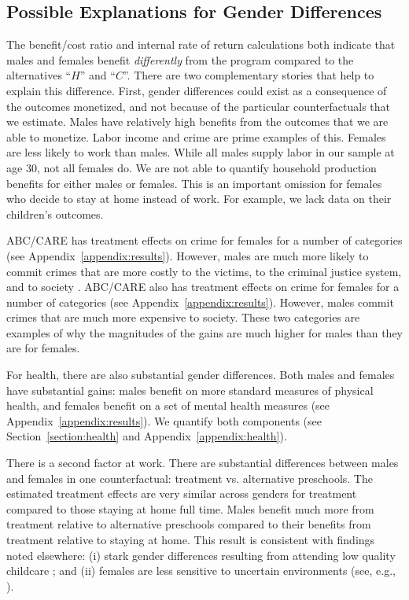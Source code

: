 \subsection{Possible Explanations for Gender Differences}

The benefit/cost ratio and internal rate of return calculations both indicate that males and females benefit \emph{differently} from the program compared to the alternatives ``$H$'' and ``$C$''. There are two complementary stories that help to explain this difference. First, gender differences could exist as a consequence of the outcomes monetized, and not because of the particular counterfactuals that we estimate. Males have relatively high benefits from the outcomes that we are able to monetize. Labor income and crime are prime examples of this. Females are less likely to work than males. While all males supply labor in our sample at age 30, not all females do. We are not able to quantify household production benefits for either males or females. This is an important omission for females who decide to stay at home instead of work. For example, we lack data on their children's outcomes.

ABC/CARE has treatment effects on crime for females for a number of categories (see Appendix~\ref{appendix:results}). However, males are much more likely to commit crimes that are more costly to the victims, to the criminal justice system, and to society \citep{Cohen-Bowles_2010_Estimating-Cost-Crime,Gregg_etal_2015_SocialRealities_BOOK}. ABC/CARE also has treatment effects on crime for females for a number of categories (see Appendix~\ref{appendix:results}). However, males commit crimes that are much more expensive to society. These two categories are examples of why the magnitudes of the gains are much higher for males than they are for females.

For health, there are also substantial gender differences. Both males and females have substantial gains: males benefit on more standard measures of physical health, and females benefit on a set of mental health measures (see Appendix~\ref{appendix:results}). We quantify both components (see Section~\ref{section:health} and Appendix~\ref{appendix:health}).

There is a second factor at work. There are substantial differences between males and females in one counterfactual: treatment vs. alternative preschools. The estimated treatment effects are very similar across genders for treatment compared to those staying at home full time. Males benefit much more from treatment relative to alternative preschools compared to their benefits from treatment relative to staying at home. This result is consistent with findings noted elsewhere: (i) stark gender differences resulting from attending low quality childcare \citep{Kottelenberg-Lehrer_2014_Gender-Effects,Baker_Gruber_Milligan_2015_Noncog_Defects}; and (ii) females are less sensitive to uncertain environments (see, e.g., \citealp{Autor-etal_2015_Family-Disadvantage}).


